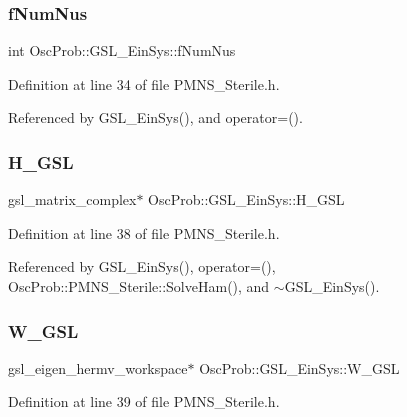 \subsubsection{\texorpdfstring{f\+Num\+Nus}{fNumNus}}
{\footnotesize\ttfamily int Osc\+Prob\+::\+G\+S\+L\+\_\+\+Ein\+Sys\+::f\+Num\+Nus}



Definition at line 34 of file P\+M\+N\+S\+\_\+\+Sterile.\+h.



Referenced by G\+S\+L\+\_\+\+Ein\+Sys(), and operator=().

\mbox{\label{structOscProb_1_1GSL__EinSys_a853e4eae015326445776f9ad7e17e513}} 
\subsubsection{\texorpdfstring{H\+\_\+\+G\+SL}{H\_GSL}}
{\footnotesize\ttfamily gsl\+\_\+matrix\+\_\+complex$\ast$ Osc\+Prob\+::\+G\+S\+L\+\_\+\+Ein\+Sys\+::\+H\+\_\+\+G\+SL}



Definition at line 38 of file P\+M\+N\+S\+\_\+\+Sterile.\+h.



Referenced by G\+S\+L\+\_\+\+Ein\+Sys(), operator=(), Osc\+Prob\+::\+P\+M\+N\+S\+\_\+\+Sterile\+::\+Solve\+Ham(), and $\sim$\+G\+S\+L\+\_\+\+Ein\+Sys().

\mbox{\label{structOscProb_1_1GSL__EinSys_a366b813a541dcfbaad2ac3d096f31aa1}} 
\subsubsection{\texorpdfstring{W\+\_\+\+G\+SL}{W\_GSL}}
{\footnotesize\ttfamily gsl\+\_\+eigen\+\_\+hermv\+\_\+workspace$\ast$ Osc\+Prob\+::\+G\+S\+L\+\_\+\+Ein\+Sys\+::\+W\+\_\+\+G\+SL}



Definition at line 39 of file P\+M\+N\+S\+\_\+\+Sterile.\+h.



